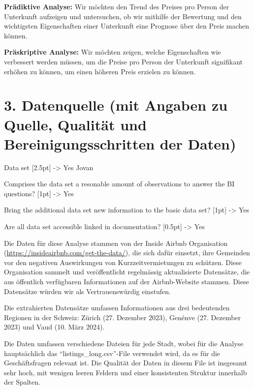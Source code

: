 \documentclass[
  journal,
]{IEEEtran}%
\begin{document}
\textbf{Prädiktive Analyse:} Wir möchten den Trend des Preises pro
Person der Unterkunft aufzeigen und untersuchen, ob wir mithilfe der
Bewertung und den wichtigsten Eigenschaften einer Unterkunft eine
Prognose über den Preis machen können.

\textbf{Präskriptive Analyse:} Wir möchten zeigen, welche Eigenschaften
wie verbessert werden müssen, um die Preise pro Person der Unterkunft
signifikant erhöhen zu können, um einen höheren Preis erzielen zu
können.

\hypertarget{datenquelle-mit-angaben-zu-quelle-qualituxe4t-und-bereinigungsschritten-der-daten}{%
\section{3. Datenquelle (mit Angaben zu Quelle, Qualität und
Bereinigungsschritten der
Daten)}\label{datenquelle-mit-angaben-zu-quelle-qualituxe4t-und-bereinigungsschritten-der-daten}}

Data set {[}2.5pt{]} -\textgreater{} Yes Jovan

Comprises the data set a resonable amount of observations to answer the
BI questions? {[}1pt{]} -\textgreater{} Yes

Bring the additional data set new information to the basic data set?
{[}1pt{]} -\textgreater{} Yes

Are all data set accessible linked in documentation? {[}0.5pt{]}
-\textgreater{} Yes

Die Daten für diese Analyse stammen von der Inside Airbnb Organisation
(\url{https://insideairbnb.com/get-the-data/}), die sich dafür einsetzt,
ihre Gemeinden vor den negativen Auswirkungen von Kurzzeitvermietungen
zu schützen. Diese Organisation sammelt und veröffentlicht regelmässig
aktualisierte Datensätze, die aus öffentlich verfügbaren Informationen
auf der Airbnb-Website stammen. Diese Datensätze würden wir als
Vertrauenswürdig einstufen.

Die extrahierten Datensätze umfassen Informationen aus drei bedeutenden
Regionen in der Schweiz: Zürich (27. Dezember 2023), Genénve (27.
Dezember 2023) und Vaud (10. März 2024).

Die Daten umfassen verschiedene Dateien für jede Stadt, wobei für die
Analyse hauptsächlich das ``listings\_long.csv''-File verwendet wird, da
es für die Geschäftsfragen relevant ist. Die Qualität der Daten in
diesem File ist insgesamt sehr hoch, mit wenigen leeren Feldern und
einer konsistenten Struktur innerhalb der Spalten.
\end{document}
